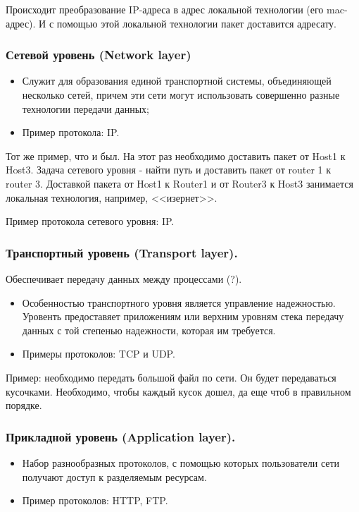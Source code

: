 \documentclass[a4paper,12pt]{article}
\begin{document}
	Происходит преобразование IP-адреса в адрес локальной технологии (его mac-адрес). И с помощью этой локальной технологии пакет доставится адресату.
	
	\subsubsection{Сетевой уровень (Network layer)}
	
	\begin{itemize}
		\item Служит для образования единой транспортной системы, объединяющей несколько сетей, причем эти сети могут использовать совершенно разные технологии передачи данных;
		\item Пример протокола: IP.
	\end{itemize}

	Тот же пример, что и был. На этот раз необходимо доставить пакет от Host1 к Host3. Задача сетевого уровня - найти путь и доставить пакет от router 1 к router 3. Доставкой пакета от Host1 к Router1 и от Router3 к Host3 занимается локальная технология, например, <<изернет>>.
	
	Пример протокола сетевого уровня: IP.
	
	\subsubsection{Транспортный уровень (Transport layer).}
	
	Обеспечивает передачу данных между процессами (?).
	
	\begin{itemize}
		\item Особенностью транспортного уровня является управление надежностью. Уровенть предоставяет приложениям или верхним уровням стека передачу данных с той степенью надежности, которая им требуется.
		\item Примеры протоколов: TCP и UDP.
	\end{itemize}

	Пример: необходимо передать большой файл по сети. Он будет передаваться кусочками. Необходимо, чтобы каждый кусок дошел, да еще чтоб в правильном порядке.

	\subsubsection{Прикладной уровень (Application layer).}
	
	\begin{itemize}
		\item Набор разнообразных протоколов, с помощью которых пользователи сети получают доступ к разделяемым ресурсам.
		\item Пример протоколов: HTTP, FTP.
	\end{itemize}
\end{document}

